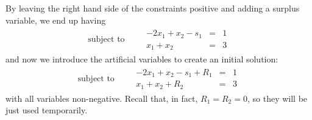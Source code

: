 \documentclass[c]{beamer}
\begin{document}
\begin{frame}
  By leaving the right hand side of the constraints positive and adding a surplus variable, we end up having
  \begin{equation*}
    \begin{aligned}
       \text{subject to }\quad &
      \begin{array}{rcl}
        -2x_1 +x_2 -s_1 &= &1 \\
        x_1+x_2 &= &3
      \end{array}
    \end{aligned}
  \end{equation*}
  and now we introduce the artificial variables to create an initial solution:
  \begin{equation*}
    \begin{aligned}
       \text{subject to }\quad &
      \begin{array}{rcl}
        -2x_1 +x_2 -s_1 +R_1&= &1 \\
        x_1+x_2 +R_2&= &3
      \end{array}
    \end{aligned}
  \end{equation*}
  with all variables non-negative. Recall that, in fact, $R_1=R_2=0$, so they will be just used temporarily.
\end{frame}
\end{document}
